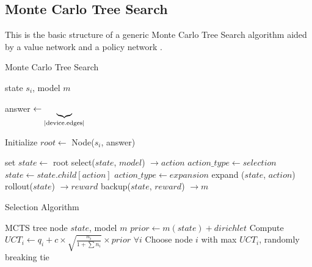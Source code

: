 \documentclass[%
 reprint,
 amsmath,amssymb,
 aps,
]{revtex4-2}
\begin{document}
\appendix

\subsection{\label{sec:method-mcts}Monte Carlo Tree Search}

This is the basic structure of a generic Monte Carlo Tree Search algorithm aided by a value network and a policy network \citep{mcts_alphago}.

\begin{algorithm}[H]
    \caption{Monte Carlo Tree Search}
    \label{algmcts}
    \begin{algorithmic}
         state $s_i$, model $m$

        answer $\leftarrow \underbrace{\vrule width0pt depth \dimexpr\dp0 + .3ex\relax\copy0}_{\textrm{|device.edges|}}$

        \STATE Initialize $root \leftarrow$ Node($s_i$, answer)

        \STATE set $state \leftarrow$ root
        \REPEAT
        \STATE select($state$, $model$) $\rightarrow action$
        \STATE $action\_type \leftarrow selection$
        \STATE $state \leftarrow state.child[action]$
        \ELSE
        \STATE $action\_type \leftarrow expansion$
        \STATE expand ($state$, $action$)
        \ENDIF
        \STATE rollout($state$) $\rightarrow reward$
        \STATE backup($state$, $reward$) $\rightarrow m$
        \ENDFOR
    \end{algorithmic}
\end{algorithm}

\begin{algorithm}[H]
    \caption{Selection Algorithm}
    \begin{algorithmic}
         MCTS tree node $state$, model $m$
        \STATE $prior \leftarrow m(state) + dirichlet$
        \STATE Compute $UCT_i \leftarrow q_i + c \times \sqrt{\frac{n_i}{1 + \sum n_i}} \times prior$ $\forall i$
        \STATE Choose node $i$ with max $UCT_i$, randomly breaking tie
    \end{algorithmic}
\end{algorithm}
\end{document}
